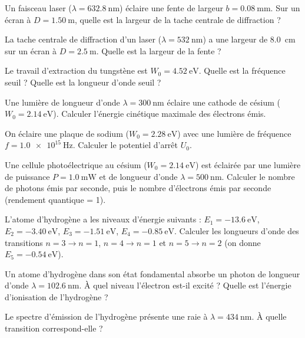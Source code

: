 \exo{}
Un faisceau laser (\(\lambda = \SI{632.8}{\nano\metre}\)) éclaire une fente de largeur \(b = \SI{0.08}{\milli\metre}\). Sur un écran à \(D = \SI{1.50}{\metre}\), quelle est la largeur de la tache centrale de diffraction ?

\exo{}
La tache centrale de diffraction d'un laser (\(\lambda = \SI{532}{\nano\metre}\)) a une largeur de \SI{8.0}{\centi\metre} sur un écran à \(D = \SI{2.5}{\metre}\). Quelle est la largeur de la fente ?


\exo{}
Le travail d'extraction du tungstène est \(W_0 = \SI{4.52}{\electronvolt}\). Quelle est la fréquence seuil ? Quelle est la longueur d'onde seuil ?

\exo{}
Une lumière de longueur d'onde \(\lambda = \SI{300}{\nano\metre}\) éclaire une cathode de césium (\(W_0 = \SI{2.14}{\electronvolt}\)). Calculer l'énergie cinétique maximale des électrons émis.

\exo{}
On éclaire une plaque de sodium (\(W_0 = \SI{2.28}{\electronvolt}\)) avec une lumière de fréquence \(f = \SI{1.0e15}{\hertz}\). Calculer le potentiel d'arrêt \(U_0\).

\exo{}
Une cellule photoélectrique au césium (\(W_0 = \SI{2.14}{\electronvolt}\)) est éclairée par une lumière de puissance \(P = \SI{1.0}{\milli\watt}\) et de longueur d'onde \(\lambda = \SI{500}{\nano\metre}\). Calculer le nombre de photons émis par seconde, puis le nombre d'électrons émis par seconde (rendement quantique = 1).


\exo{}
L'atome d'hydrogène a les niveaux d'énergie suivants : \(E_1 = \SI{-13.6}{\electronvolt}\), \(E_2 = \SI{-3.40}{\electronvolt}\), \(E_3 = \SI{-1.51}{\electronvolt}\), \(E_4 = \SI{-0.85}{\electronvolt}\). Calculer les longueurs d'onde des transitions \(n=3 \to n=1\), \(n=4 \to n=1\) et \(n=5 \to n=2\) (on donne \(E_5 = \SI{-0.54}{\electronvolt}\)).

\exo{}
Un atome d'hydrogène dans son état fondamental absorbe un photon de longueur d'onde \(\lambda = \SI{102.6}{\nano\metre}\). À quel niveau l'électron est-il excité ? Quelle est l'énergie d'ionisation de l'hydrogène ?

\exo{}
Le spectre d'émission de l'hydrogène présente une raie à \(\lambda = \SI{434}{\nano\metre}\). À quelle transition correspond-elle ?

